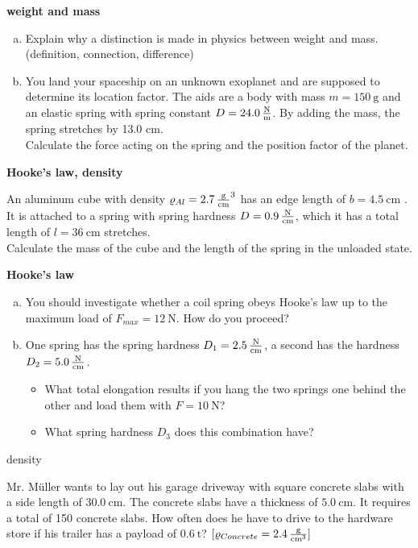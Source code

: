 \documentclass[a4paper]{article}
\begin{document}
	
	\begin{enumerate}[1.]
		\item {\bf weight and mass}
		\begin{enumerate}[a)]
			\item Explain why a distinction is made in physics between weight and mass. (definition, connection, difference)
			\item You land your spaceship on an unknown exoplanet and are supposed to determine its location factor. The aids are a body with mass $m=\SI{150}{\gram}$ and an elastic spring with spring constant $ D=\SI{24.0}{\newton\over\meter}$. By adding the mass, the spring stretches by 13.0 cm.\\
			Calculate the force acting on the spring and the position factor of the planet.
		\end{enumerate}
		
		\item {\bf Hooke's law, density}
		
		An aluminum cube with density $ \varrho_{Al}=\SI{2.7}{\gram\over\centi\meter^3}$ has an edge length of
		$b=\SI{4,5}{\centi\meter}$ . It is attached to a spring with spring hardness $D=\SI{0.9}{\newton\over\centi\meter}$, which it has a total length of $l=\SI{36}{\centi\meter }$ stretches. \\
		Calculate the mass of the cube and the length of the spring in the unloaded state.
		
		
		\item {\bf Hooke's law}
		\begin{enumerate}[a)]
			\item You should investigate whether a coil spring obeys Hooke's law up to the maximum load of $F_{max}=\SI{12}{\newton}$. How do you proceed?
			\item One spring has the spring hardness $ D_1=\SI{2.5}{\newton\over\centi\meter}$, a second has the hardness $ D_2=\SI{5.0}{\newton\over \centi\meter}$.
			\begin{itemize}
				\item What total elongation results if you hang the two springs one behind the other and load them with $F=\SI{10}{\newton}$?
				\item What spring hardness $D_3$ does this combination have?
			\end{itemize}
		\end{enumerate}
		
		
		{\bf \item density}
		
		Mr. Müller wants to lay out his garage driveway with square concrete slabs with a side length of $\SI{30.0}{\centi\meter}$. The concrete slabs have a thickness of $\SI{5.0}{\centi\meter}$. It requires a total of 150 concrete slabs. How often does he have to drive to the hardware store if his trailer has a payload of $\SI{0.6}{\tonne}$? $[ \varrho_{Concrete}=\SI{2,4}{\gram\over \centi{\meter^3}} ]$
		
	\end{enumerate}
	
\end{document}
